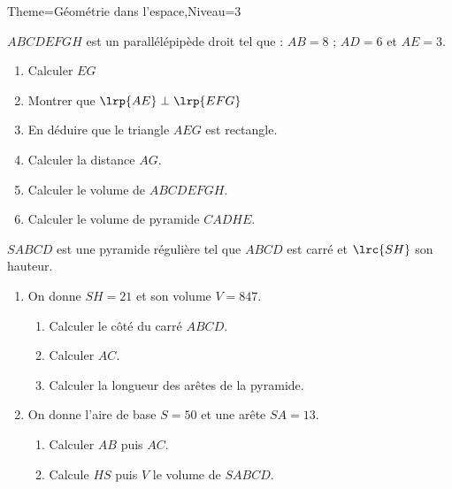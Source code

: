 \documentclass[a4paper,12pt]{article}
\begin{document}
\begin{Maquette}[Fiche]{Theme=Géométrie dans l'espace,Niveau=3}

\begin{exercice}
\begin{minipage}{0.5\linewidth}
$ABCDEFGH$ est un parallélépipède droit tel que : $AB=8$ ; $AD=6$ et $AE=3$.
\begin{enumerate}
\item Calculer $EG$
\item Montrer que $\lrp{AE}\perp\lrp{EFG}$
\item En déduire que le triangle $AEG$ est rectangle.
\item Calculer la distance $AG$.
\item Calculer le volume de $ABCDEFGH$.
\item Calculer le volume de pyramide $CADHE$.
\end{enumerate}
\end{minipage}%
\begin{minipage}{0.5\linewidth}
\end{minipage}
\end{exercice}

\begin{exercice}
\begin{minipage}{0.6\linewidth}
$SABCD$ est une pyramide régulière tel que $ABCD$ est carré et $\lrc{SH}$ son hauteur.
\begin{enumerate}
\item On donne $SH=21$ et son volume $V=847$.
\begin{enumerate}
\item Calculer le côté du carré $ABCD$.
\item Calculer $AC$.
\item Calculer la longueur des arêtes de la pyramide.
\end{enumerate}
\item On donne l'aire de base $S=50$ et une arête $SA=13$.
\begin{enumerate}
\item Calculer $AB$  puis $AC$.
\item Calcule $HS$ puis $V$ le volume de $SABCD$.
\end{enumerate}
\end{enumerate}
\end{minipage}%
\begin{minipage}{0.4\linewidth}
\end{minipage}
\end{exercice}


\end{Maquette}
\end{document}
